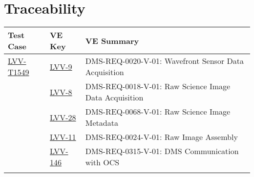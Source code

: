 \section{Traceability}

\begin{longtable}{p{3cm}p{3cm}L{9cm}}
\hline
\textbf{Test Case} & \textbf{VE Key} & \textbf{VE Summary} \\ \hline
\href{https://jira.lsstcorp.org/secure/Tests.jspa#/testCase/LVV-T1549}{LVV-T1549} &
  \href{https://jira.lsstcorp.org/browse/LVV-9}{LVV-9}
  & DMS-REQ-0020-V-01: Wavefront Sensor Data Acquisition
 \\ 
 &   \href{https://jira.lsstcorp.org/browse/LVV-8}{LVV-8}
  & DMS-REQ-0018-V-01: Raw Science Image Data Acquisition
 \\ 
 &   \href{https://jira.lsstcorp.org/browse/LVV-28}{LVV-28}
  & DMS-REQ-0068-V-01: Raw Science Image Metadata
 \\ 
 &   \href{https://jira.lsstcorp.org/browse/LVV-11}{LVV-11}
  & DMS-REQ-0024-V-01: Raw Image Assembly
 \\ 
 &   \href{https://jira.lsstcorp.org/browse/LVV-146}{LVV-146}
  & DMS-REQ-0315-V-01: DMS Communication with OCS
 \\ 
\hline
\end{longtable}
